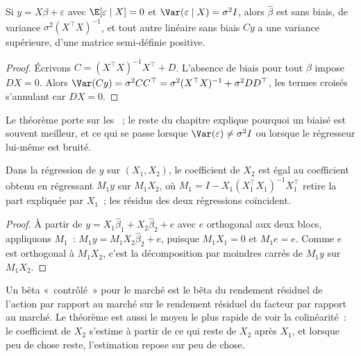 \begin{theorem}\label{thm:qm:linear-models-under-stress:gm}
Si $y = X\beta + \varepsilon$ avec $\E[\varepsilon \mid X] = 0$ et $\Var(\varepsilon \mid X) = \sigma^2I$, alors $\hat\beta$ est sans biais, de
variance $\sigma^2(X^\top X)^{-1}$, et tout autre  linéaire sans biais $Cy$ a une variance supérieure, d'une matrice semi-définie positive.
\end{theorem}

\begin{proof}
Écrivons $C = (X^\top X)^{-1}X^\top + D$. L'absence de biais pour tout $\beta$ impose $DX = 0$. Alors $\Var(Cy) = \sigma^2CC^\top = \sigma^2(X^\top X)^{-1} +
\sigma^2DD^\top$, les termes croisés s'annulant car $DX = 0$.
\end{proof}

Le théorème porte sur les ~; le reste du chapitre explique pourquoi un  biaisé est souvent meilleur, et
ce qui se passe lorsque $\Var(\varepsilon) \ne \sigma^2I$ ou lorsque le régresseur lui-même est bruité.

\begin{theorem}\label{thm:qm:linear-models-under-stress:fwl}
Dans la régression de $y$ sur $(X_1, X_2)$, le coefficient de $X_2$ est égal au coefficient obtenu en régressant $M_1y$ sur $M_1X_2$, où $M_1 =
I - X_1(X_1^\top X_1)^{-1}X_1^\top$ retire la part expliquée par $X_1$~; les résidus des deux régressions coïncident.
\end{theorem}

\begin{proof}
À partir de $y = X_1\hat\beta_1 + X_2\hat\beta_2 + e$ avec $e$ orthogonal aux deux blocs, appliquons $M_1$~: $M_1y = M_1X_2\hat\beta_2 + e$, puisque $M_1X_1 = 0$ et
$M_1e = e$. Comme $e$ est orthogonal à $M_1X_2$, c'est la décomposition par moindres carrés de $M_1y$ sur $M_1X_2$.
\end{proof}

Un bêta «~contrôlé~» pour le marché est le bêta du rendement résiduel de l'action par rapport au marché sur le rendement résiduel du facteur par rapport au marché. Le
théorème est aussi le moyen le plus rapide de voir la colinéarité~: le coefficient de $X_2$ s'estime à partir de ce qui reste de $X_2$ après $X_1$, et
lorsque peu de chose reste, l'estimation repose sur peu de chose.


